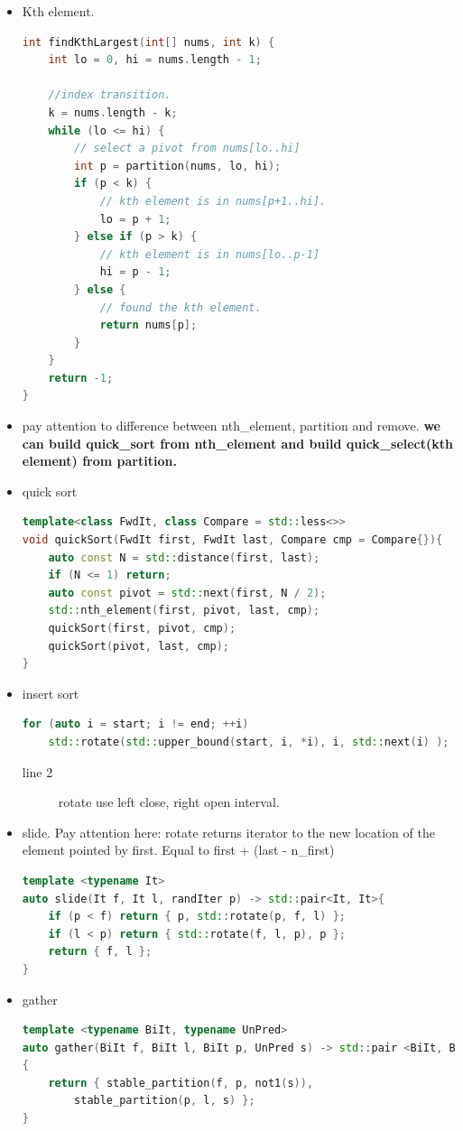 \documentclass[a4paper,11pt,twoside]{book}
\begin{document}
\begin{itemize}
	\item Kth element. 
\begin{lstlisting}[frame=single, language=c++]	
int findKthLargest(int[] nums, int k) {
	int lo = 0, hi = nums.length - 1;

	//index transition.
	k = nums.length - k;
	while (lo <= hi) {
		// select a pivot from nums[lo..hi] 
		int p = partition(nums, lo, hi);
		if (p < k) {
			// kth element is in nums[p+1..hi].
			lo = p + 1;
		} else if (p > k) {
			// kth element is in nums[lo..p-1]
			hi = p - 1;
		} else {
			// found the kth element.
			return nums[p];
		}
	}
	return -1;
}
\end{lstlisting}	

	\item pay attention to difference between nth\_element, partition and remove. \textbf{we can build quick\_sort from nth\_element and build quick\_select(kth element) from partition.} 


	\item quick sort
\begin{lstlisting}[frame=single, language=c++]	
template<class FwdIt, class Compare = std::less<>>
void quickSort(FwdIt first, FwdIt last, Compare cmp = Compare{}){
	auto const N = std::distance(first, last);
	if (N <= 1) return; 
	auto const pivot = std::next(first, N / 2);
	std::nth_element(first, pivot, last, cmp);
	quickSort(first, pivot, cmp); 
	quickSort(pivot, last, cmp); 
}	
\end{lstlisting}	
	
	
	\item insert sort
\begin{lstlisting}[frame=single, language=c++]	
for (auto i = start; i != end; ++i)
	std::rotate(std::upper_bound(start, i, *i), i, std::next(i) );	
\end{lstlisting}
\begin{description}
	\item[line 2] rotate use left close, right open interval.
\end{description}	

	\item slide. Pay attention here: rotate returns iterator to the new location of the element pointed by first. Equal to first + (last - n\_first)
\begin{lstlisting}[frame=single, language=c++]
template <typename It> 
auto slide(It f, It l, randIter p) -> std::pair<It, It>{
	if (p < f) return { p, std::rotate(p, f, l) };
	if (l < p) return { std::rotate(f, l, p), p };
	return { f, l };
}
\end{lstlisting}

	\item gather
\begin{lstlisting}[frame=single, language=c++]
template <typename BiIt, typename UnPred> 
auto gather(BiIt f, BiIt l, BiIt p, UnPred s) -> std::pair <BiIt, BiIt>
{
	return { stable_partition(f, p, not1(s)), 
		stable_partition(p, l, s) };
}
\end{lstlisting}
	
	
	
\end{itemize}
\end{document}
